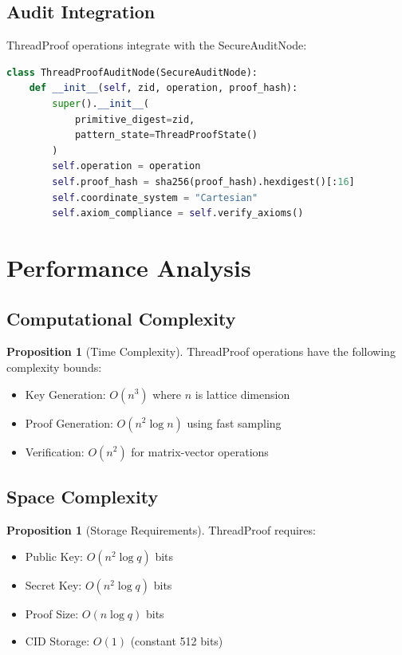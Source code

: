 \documentclass[11pt]{article}
\theoremstyle{definition}
\newtheorem{proposition}[theorem]{Proposition}
\begin{document}
\subsection{Audit Integration}

ThreadProof operations integrate with the SecureAuditNode:

\begin{lstlisting}[language=Python, caption=ThreadProof Audit Trail]
class ThreadProofAuditNode(SecureAuditNode):
    def __init__(self, zid, operation, proof_hash):
        super().__init__(
            primitive_digest=zid,
            pattern_state=ThreadProofState()
        )
        self.operation = operation
        self.proof_hash = sha256(proof_hash).hexdigest()[:16]
        self.coordinate_system = "Cartesian"
        self.axiom_compliance = self.verify_axioms()
\end{lstlisting}

\section{Performance Analysis}

\subsection{Computational Complexity}

\begin{proposition}[Time Complexity]
ThreadProof operations have the following complexity bounds:
\begin{itemize}
  \item Key Generation: $O(n^3)$ where $n$ is lattice dimension
  \item Proof Generation: $O(n^2 \log n)$ using fast sampling
  \item Verification: $O(n^2)$ for matrix-vector operations
\end{itemize}
\end{proposition}

\subsection{Space Complexity}

\begin{proposition}[Storage Requirements]
ThreadProof requires:
\begin{itemize}
  \item Public Key: $O(n^2 \log q)$ bits
  \item Secret Key: $O(n^2 \log q)$ bits  
  \item Proof Size: $O(n \log q)$ bits
  \item CID Storage: $O(1)$ (constant 512 bits)
\end{itemize}
\end{proposition}
\end{document}
